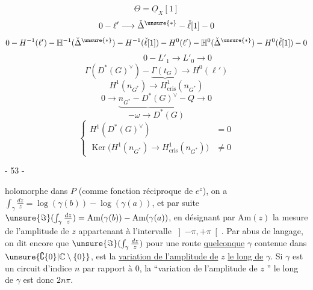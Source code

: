 \[\Theta=\underline O_X[1]\]
\[
0\mathbin{-}\ell'\longrightarrow\check\Delta^{\unsure{*}}\mathbin{-}\check\ell[1]\mathbin{-}0
\]
\[
0\mathbin{-}H^{-1}(\ell')\mathbin{-}\mathbb H^{-1}(\check\Delta^{\unsure{*}})\mathbin{-}H^{-1}(\check\ell[1])\mathbin{-}H^0(\ell')\mathbin{-}\mathbb H^0(\check\Delta^{\unsure{*}})\mathbin{-}H^0(\check\ell[1])\mathbin{-}0
\]
\[
\hspace{5em}0\mathbin{-}L'_1\longrightarrow L'_0\longrightarrow0
\]
\[
\Gamma(D^*(G)^\vee)\mathbin{-}\underbrace{\Gamma(t_G)}\longrightarrow H^0(\ell')
\]
\[
H^1(n_{G^*})\longrightarrow H^1_{\mathrm{cris}}(n_{G^*})
\]
\[
0\longrightarrow\underbrace{n_{G^*}\mathbin{-}D^*(G)^\vee}\mathbin{-}Q\longrightarrow0
\]
\[
\mathbin{-}\omega\longrightarrow D^*(G)
\]
\[
\left\{\begin{aligned}
H^1(D^*(G)^\vee)&=0\\
\operatorname{Ker}\bigl(H^1(n_{G^*})\longrightarrow H^1_{\mathrm{cris}}(n_{G^*})\bigr)&\ne0
\end{aligned}\right.
\]
\begin{center}- 53 -\end{center}
holomorphe dans $P$ (comme fonction réciproque de $e^z$), on a $\int_\gamma\frac{dz}{z}=\log(\gamma(b))-\log(\gamma(a))$, et par suite $\unsure{\Im}(\int_\gamma\frac{dz}{z})=\mathrm{Am}(\gamma(b))-\mathrm{Am}(\gamma(a))$, en désignant par $\mathrm{Am}(z)$ la mesure de l'amplitude de $z$ appartenant à l'intervalle $\left]-\pi,+\pi\right[$. Par abus de langage, on dit encore que $\unsure{\Im}(\int_\gamma\frac{dz}{z})$ pour une route \uline{quelconque} $\gamma$ contenue dans $\unsure{\complement\{0\}|\mathbb C\setminus\{0\}}$, est la \uline{variation de l'amplitude de} $z$ \uline{le long de} $\gamma$. Si $\gamma$ est un circuit d'indice $n$ par rapport à $0$, la ``variation de l'amplitude de $z$ '' le long de $\gamma$ est donc $2n\pi$.

